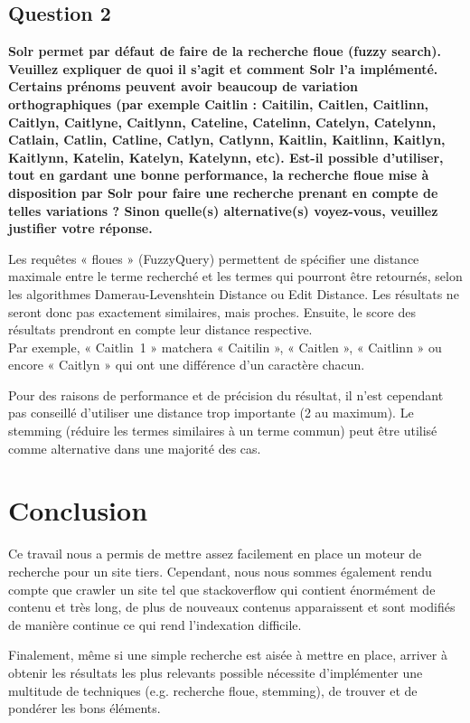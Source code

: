 \documentclass[a4paper]{article}
\begin{document}
	\subsection{Question 2}
	{\bfseries
	Solr permet par défaut de faire de la recherche floue (fuzzy search).
	Veuillez expliquer de quoi il s'agit et comment Solr l'a implémenté.
	Certains prénoms peuvent avoir beaucoup de variation orthographiques
	(par exemple Caitlin : Caitilin, Caitlen, Caitlinn, Caitlyn, Caitlyne, Caitlynn,
	Cateline, Catelinn, Catelyn, Catelynn, Catlain, Catlin, Catline, Catlyn, Catlynn,
	Kaitlin, Kaitlinn, Kaitlyn, Kaitlynn, Katelin, Katelyn, Katelynn, etc).
	Est-il possible d'utiliser, tout en gardant une bonne performance,
	la recherche floue mise à disposition par Solr pour faire une recherche prenant en compte de telles variations ?
	Sinon quelle(s) alternative(s) voyez-vous, veuillez justifier votre réponse. 
	}

	Les requêtes « floues » (FuzzyQuery) permettent de spécifier une distance maximale entre le terme recherché
	et les termes qui pourront être retournés, selon les algorithmes Damerau-Levenshtein Distance ou Edit Distance.
	Les résultats ne seront donc pas exactement similaires, mais proches. Ensuite, le score des résultats prendront en compte leur distance respective. \\
	Par exemple, « Caitlin~1 » matchera « Caitilin », « Caitlen », « Caitlinn » ou encore « Caitlyn » qui ont une différence d'un caractère chacun.

	Pour des raisons de performance et de précision du résultat,
	il n'est cependant pas conseillé d'utiliser une distance trop importante (2 au maximum).
	Le stemming (réduire les termes similaires à un terme commun) peut être utilisé comme alternative dans une majorité des cas.

	\section{Conclusion}
	Ce travail nous a permis de mettre assez facilement en place un moteur de recherche pour un site tiers.
	Cependant, nous nous sommes également rendu compte que crawler un site tel que stackoverflow qui contient énormément de contenu
	et très long, de plus de nouveaux contenus apparaissent et sont modifiés de manière continue ce qui rend l'indexation difficile.

	Finalement, même si une simple recherche est aisée à mettre en place,
	arriver à obtenir les résultats les plus relevants possible nécessite d'implémenter une multitude de techniques
	(e.g. recherche floue, stemming), de trouver et de pondérer les bons éléments.
\end{document}
